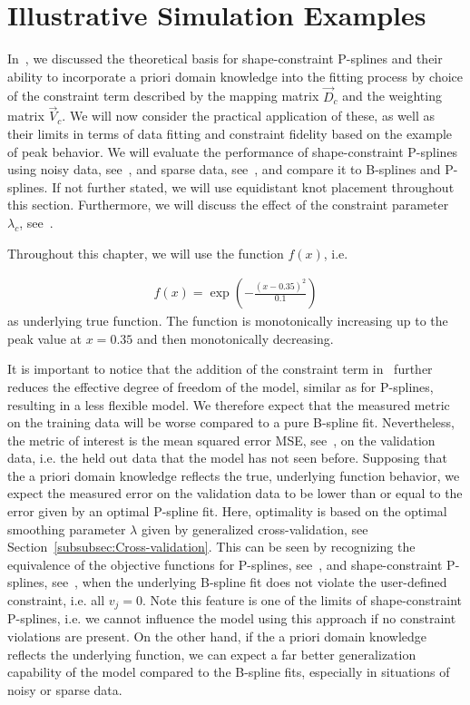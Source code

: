 \chapter{Illustrative Simulation Examples} \label{cha:practical-considerations}

In~, we discussed the theoretical basis for shape-constraint P-splines and their ability to incorporate a priori domain knowledge into the fitting process by choice of the constraint term described by the mapping matrix $\vec{D}_c$ and the weighting matrix $\vec{V}_c$. We will now consider the practical application of these, as well as their limits in terms of data fitting and constraint fidelity  based on the example of peak behavior. We will evaluate the performance of shape-constraint P-splines using noisy data, see~, and sparse data, see~, and compare it to B-splines and P-splines. If not further stated, we will use equidistant knot placement throughout this section. Furthermore, we will discuss the effect of the constraint parameter $\lambda_c$, see~.

Throughout this chapter, we will use the function $f(x)$, i.e.

\begin{align} \label{eq:true-func-peak}
	f(x) = \exp\left(-\frac{(x - 0.35)^2}{0.1} \right)
\end{align}
% 
as underlying true function. The function is monotonically increasing up to the peak value at $x = 0.35$ and then monotonically decreasing.  

It is important to notice that the addition of the constraint term in~ further reduces the effective degree of freedom of the model, similar as for P-splines, resulting in a less flexible model. We therefore expect that the measured metric on the training data will be worse compared to a pure B-spline fit. Nevertheless, the metric of interest is the mean squared error MSE, see~, on the validation data, i.e. the held out data that the model has not seen before. Supposing that the a priori domain knowledge reflects the true, underlying function behavior, we expect the measured error on the validation data to be lower than or equal to the error given by an optimal P-spline fit. Here, optimality is based on the optimal smoothing parameter $\lambda$ given by generalized cross-validation, see Section~\ref{subsubsec:Cross-validation}. This can be seen by recognizing the equivalence of the objective functions for P-splines, see~, and shape-constraint P-splines, see~, when the underlying B-spline fit does not violate the user-defined constraint, i.e. all $v_j=0$. Note this feature is one of the limits of shape-constraint P-splines, i.e. we cannot influence the model using this approach if no constraint violations are present. On the other hand, if the a priori domain knowledge reflects the underlying function, we can expect a far better generalization capability of the model compared to the B-spline fits, especially in situations of noisy or sparse data.



